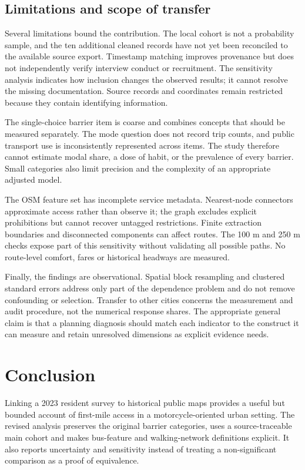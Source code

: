 \documentclass[
  11pt,
  a4paper,
]{article}
\begin{document}
\subsection{Limitations and scope of
transfer}\label{limitations-and-scope-of-transfer}

Several limitations bound the contribution. The local cohort is not a
probability sample, and the ten additional cleaned records have not yet
been reconciled to the available source export. Timestamp matching
improves provenance but does not independently verify interview conduct
or recruitment. The sensitivity analysis indicates how inclusion changes
the observed results; it cannot resolve the missing documentation.
Source records and coordinates remain restricted because they contain
identifying information.

The single-choice barrier item is coarse and combines concepts that
should be measured separately. The mode question does not record trip
counts, and public transport use is inconsistently represented across
items. The study therefore cannot estimate modal share, a dose of habit,
or the prevalence of every barrier. Small categories also limit
precision and the complexity of an appropriate adjusted model.

The OSM feature set has incomplete service metadata. Nearest-node
connectors approximate access rather than observe it; the graph excludes
explicit prohibitions but cannot recover untagged restrictions. Finite
extraction boundaries and disconnected components can affect routes. The
100 m and 250 m checks expose part of this sensitivity without
validating all possible paths. No route-level comfort, fares or
historical headways are measured.

Finally, the findings are observational. Spatial block resampling and
clustered standard errors address only part of the dependence problem
and do not remove confounding or selection. Transfer to other cities
concerns the measurement and audit procedure, not the numerical response
shares. The appropriate general claim is that a planning diagnosis
should match each indicator to the construct it can measure and retain
unresolved dimensions as explicit evidence needs.

\section{Conclusion}\label{conclusion}

Linking a 2023 resident survey to historical public maps provides a
useful but bounded account of first-mile access in a motorcycle-oriented
urban setting. The revised analysis preserves the original barrier
categories, uses a source-traceable main cohort and makes bus-feature
and walking-network definitions explicit. It also reports uncertainty
and sensitivity instead of treating a non-significant comparison as a
proof of equivalence.
\end{document}
